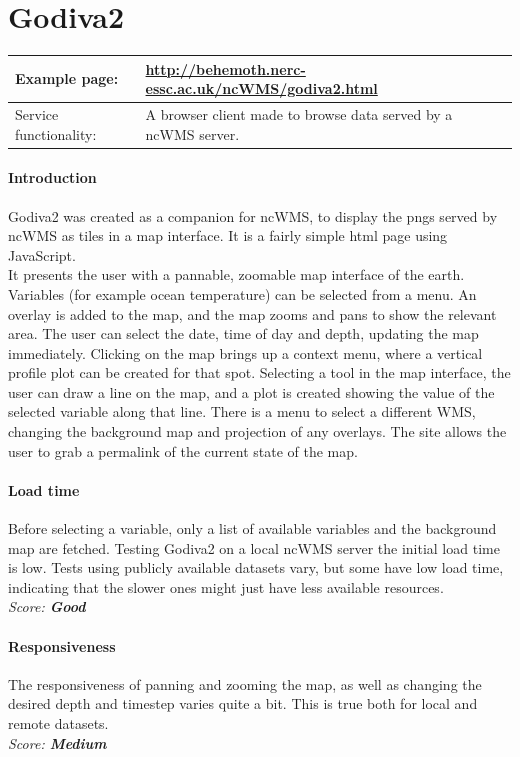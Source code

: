 \documentclass[11pt,a4paper,titlepage,oneside]{report}
\begin{document}
  \section{Godiva2}
     \begin{tabular}{|p{4cm}|p{8cm}|}
     \hline
     Example page: & \url{http://behemoth.nerc-essc.ac.uk/ncWMS/godiva2.html} \\
     \hline
     Service functionality: & A browser client made to browse data served by a ncWMS server. \\
     \hline
   \end{tabular}
   
  \paragraph{Introduction}
  Godiva2 was created as a companion for ncWMS, to display the pngs served by ncWMS as tiles in a map interface. It is a fairly simple html page using JavaScript. \\
   It presents the user with a pannable, zoomable map interface of the earth. Variables (for example ocean temperature) can be selected from a menu. An overlay is added to the map, and the map zooms and pans to show the relevant area. The user can select the date, time of day and depth, updating the map immediately. Clicking on the map brings up a context menu, where a vertical profile plot can be created for that spot. Selecting a tool in the map interface, the user can draw a line on the map, and a plot is created showing the value of the selected variable along that line. There is a menu to select a different WMS, changing the background map and projection of any overlays. The site allows the user to grab a permalink of the current state of the map.

	\paragraph{Load time}
	Before selecting a variable, only a list of available variables and the background map are fetched. Testing Godiva2 on a local ncWMS server the initial load time is low. Tests using publicly available datasets vary, but some have low load time, indicating that the slower ones might just have less available resources.
   \\ \emph{Score: \textbf{Good}}
	
	\paragraph{Responsiveness}
	The responsiveness of panning and zooming the map, as well as changing the desired depth and timestep varies quite a bit. This is true both for local and remote datasets.
   \\ \emph{Score: \textbf{Medium}}
	
\end{document}
